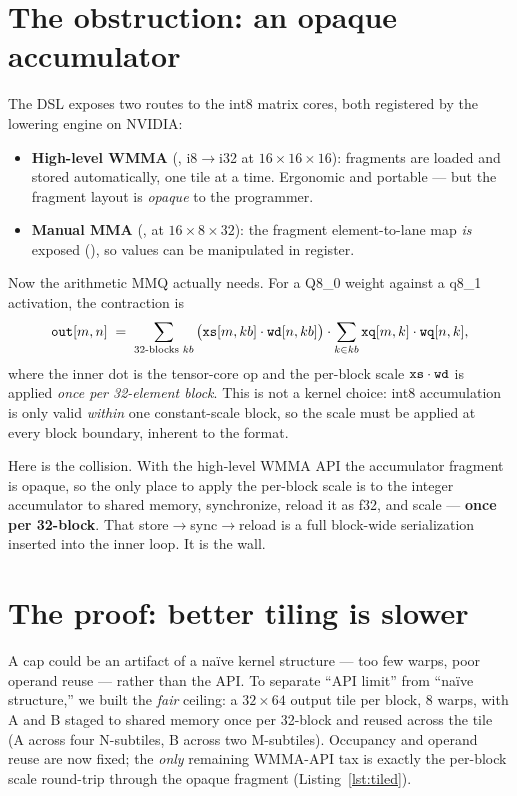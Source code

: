 \documentclass[11pt]{article}
\begin{document}
\section{The obstruction: an opaque accumulator}
\label{sec:obstruction}

The DSL exposes two routes to the int8 matrix cores, both registered by the lowering engine on NVIDIA:
\begin{itemize}[leftmargin=1.4em,itemsep=2pt]
\item \textbf{High-level WMMA} (, i8$\to$i32 at $16{\times}16{\times}16$): fragments are
loaded and stored automatically, one tile at a time. Ergonomic and portable --- but the fragment layout
is \emph{opaque} to the programmer.
\item \textbf{Manual MMA} (,  at $16{\times}8{\times}32$): the
fragment element-to-lane map \emph{is} exposed (), so values can be manipulated in
register.
\end{itemize}

Now the arithmetic MMQ actually needs. For a Q8\_0 weight against a q8\_1 activation, the contraction is
\[
\texttt{out}[m,n]\;=\;\sum_{\text{32-blocks }kb}\big(\texttt{xs}[m,kb]\cdot \texttt{wd}[n,kb]\big)\cdot
\sum_{k\in kb}\texttt{xq}[m,k]\cdot\texttt{wq}[n,k],
\]
where the inner  dot is the tensor-core op and the per-block  scale
$\texttt{xs}\cdot\texttt{wd}$ is applied \emph{once per 32-element block}. This is not a kernel choice: int8
accumulation is only valid \emph{within} one constant-scale block, so the scale must be applied at every
block boundary, inherent to the format.

Here is the collision. With the high-level WMMA API the accumulator fragment is opaque, so the only place
to apply the per-block scale is to  the integer accumulator to shared memory,
synchronize, reload it as f32, and scale --- \textbf{once per 32-block}. That store$\to$sync$\to$reload is
a full block-wide serialization inserted into the inner loop. It is the wall.

\section{The proof: better tiling is slower}
\label{sec:proof}

A cap could be an artifact of a na\"ive kernel structure --- too few warps, poor operand reuse --- rather
than the API. To separate ``API limit'' from ``na\"ive structure,'' we built the \emph{fair} ceiling: a
$32{\times}64$ output tile per block, 8 warps, with A and B staged to shared memory once per 32-block and
reused across the tile (A across four N-subtiles, B across two M-subtiles). Occupancy and operand reuse
are now fixed; the \emph{only} remaining WMMA-API tax is exactly the per-block scale round-trip through
the opaque fragment (Listing~\ref{lst:tiled}).
\end{document}
